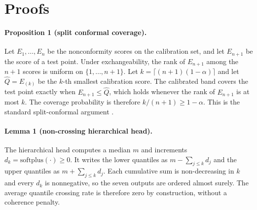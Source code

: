 \documentclass[twoside]{article}
\begin{document}
\begin{table}[t]
\centering
\scriptsize
\caption{Source data files and SHA-256 checksums.}
\label{tab:checksums}
\end{table}

\section{Proofs}

\paragraph{Proposition 1 (split conformal coverage).} Let $E_1,\dots,E_n$ be the nonconformity scores on the calibration set, and let $E_{n+1}$ be the score of a test point. Under exchangeability, the rank of $E_{n+1}$ among the $n+1$ scores is uniform on $\{1,\dots,n+1\}$. Let $k = \lceil (n+1)(1-\alpha)\rceil$ and let $\hat Q = E_{(k)}$ be the $k$-th smallest calibration score. The calibrated band covers the test point exactly when $E_{n+1} \le \hat Q$, which holds whenever the rank of $E_{n+1}$ is at most $k$. The coverage probability is therefore $k/(n+1) \ge 1-\alpha$. This is the standard split-conformal argument \citep{vovk2005algorithmic, lei2018distribution}.

\paragraph{Lemma 1 (non-crossing hierarchical head).} The hierarchical head computes a median $m$ and increments $d_k = \mathrm{softplus}(\cdot) \ge 0$. It writes the lower quantiles as $m - \sum_{j \le k} d_j$ and the upper quantiles as $m + \sum_{j \le k} d_j$. Each cumulative sum is non-decreasing in $k$ and every $d_k$ is nonnegative, so the seven outputs are ordered almost surely. The average quantile crossing rate is therefore zero by construction, without a coherence penalty.
\end{document}
